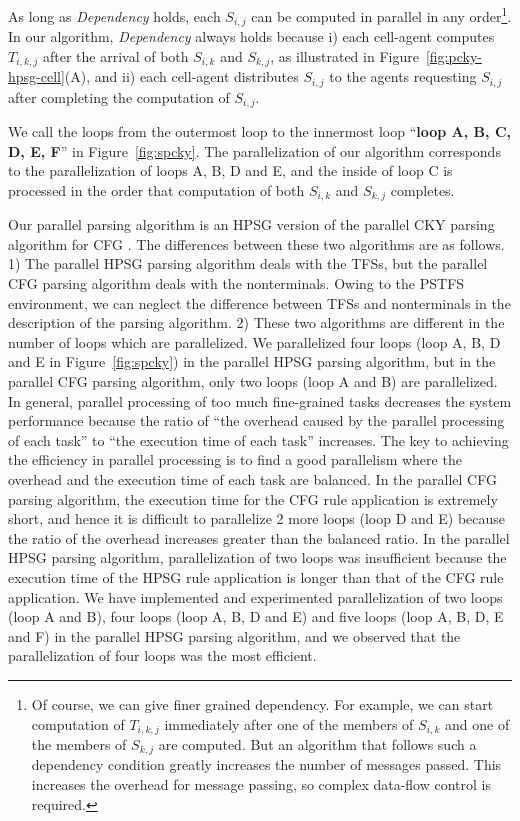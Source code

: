   As long as {\it Dependency} holds, each $S_{i,j}$ can be computed in
parallel in any order\footnote{Of course, we can give finer grained
dependency.  For example, we can start computation of $T_{i,k,j}$
immediately after one of the members of $S_{i,k}$ and one of the
members of $S_{k,j}$ are computed.  But an algorithm that follows such
a dependency condition greatly increases the number of messages
passed.  This increases the overhead for message passing, so complex
data-flow control is required.}.  In our algorithm, {\it Dependency}
always holds because i) each cell-agent computes $T_{i,k,j}$ after the
arrival of both $S_{i,k}$ and $S_{k,j}$, as illustrated in
Figure~\ref{fig:pcky-hpsg-cell}(A), and ii) each cell-agent
distributes $S_{i,j}$ to the agents requesting $S_{i,j}$ after
completing the computation of $S_{i,j}$.

  We call the loops from the outermost loop to the innermost loop
``{\bf loop A, B, C, D, E, F}'' in Figure~\ref{fig:spcky}.  The
parallelization of our algorithm corresponds to the parallelization of
loops A, B, D and E, and the inside of loop C is processed in the
order that computation of both $S_{i,k}$ and $S_{k,j}$ completes.


  Our parallel parsing algorithm is an HPSG version of the parallel
CKY parsing algorithm for CFG \cite{Ninomiya97-3}.  The differences
between these two algorithms are as follows.  1) The parallel HPSG
parsing algorithm deals with the TFSs, but the parallel CFG parsing
algorithm deals with the nonterminals.  Owing to the PSTFS environment,
we can neglect the difference between TFSs and nonterminals in the
description of the parsing algorithm.  2) These two algorithms are
different in the number of loops which are parallelized.  We
parallelized four loops (loop A, B, D and E in Figure~\ref{fig:spcky})
in the parallel HPSG parsing algorithm, but in the parallel CFG
parsing algorithm, only two loops (loop A and B) are parallelized.  In
general, parallel processing of too much fine-grained tasks decreases
the system performance because the ratio of ``the overhead caused by
the parallel processing of each task'' to ``the execution time of each
task'' increases.  The key to achieving the efficiency in parallel
processing is to find a good parallelism where the overhead and the
execution time of each task are balanced.  In the parallel CFG parsing
algorithm, the execution time for the CFG rule application is
extremely short, and hence it is difficult to parallelize 2 more loops
(loop D and E) because the ratio of the overhead increases greater
than the balanced ratio.  In the parallel HPSG parsing algorithm,
parallelization of two loops was insufficient because the execution
time of the HPSG rule application is longer than that of the CFG rule
application.  We have implemented and experimented parallelization of
two loops (loop A and B), four loops (loop A, B, D and E) and five
loops (loop A, B, D, E and F) in the parallel HPSG parsing algorithm,
and we observed that the parallelization of four loops was the most
efficient.

